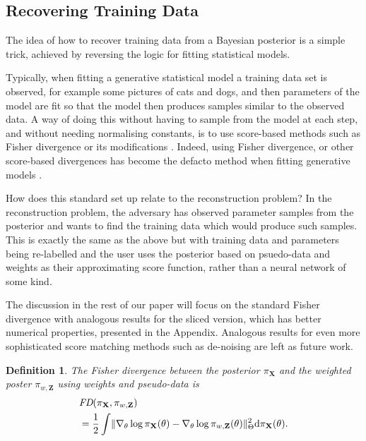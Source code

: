 \documentclass[hyperref]{article}
\theoremstyle{plain}
\newtheorem{definition}[theorem]{Definition}
\theoremstyle{remark}
\newcommand{\bX}{\mathbf{X}}
\newcommand{\bZ}{\mathbf{Z}}
\begin{document}
\subsection{Recovering Training Data}\label{subsec:bayesian_recovery}
The idea of how to recover training data from a Bayesian posterior is a simple trick, achieved by reversing the logic for fitting statistical models. 

Typically, when fitting a generative statistical model a training data set is observed, for example some pictures of cats and dogs, and then parameters of the model are fit so that the model then produces samples similar to the observed data. A way of doing this without having to sample from the model at each step, and without needing normalising constants, is to use score-based methods such as Fisher divergence or its modifications \citep{hyvarinen2005,song2019sliced}. Indeed, using Fisher divergence, or other score-based divergences has become the defacto method when fitting generative models \citep{Song2020_how_to_train}. 

How does this standard set up relate to the reconstruction problem? In the reconstruction problem, the adversary has observed parameter samples from the posterior and wants to find the training data which would produce such samples. This is exactly the same as the above but with training data and parameters being re-labelled and the user uses the posterior based on psuedo-data and weights as their approximating score function, rather than a neural network of some kind. 

The discussion in the rest of our paper will focus on the standard Fisher divergence with analogous results for the sliced version, which has better numerical properties, presented in the Appendix. Analogous results for even more sophisticated score matching methods such as de-noising are left as future work. 

\begin{definition}
	The Fisher divergence between the posterior $\pi_{\bX}$ and the weighted poster $\pi_{w,\bZ}$ using weights and pseudo-data is 
	\begin{align}
		&\emph{FD}(\pi_{\bX},\pi_{w,\bZ}) \nonumber\\
		& = \frac{1}{2}\int \lVert \nabla_{\theta}\log\pi_{\bX}(\theta) - \nabla_{\theta}\log\pi_{w,\bZ}(\theta)\rVert_{\Theta}^{2}\mathrm{d}\pi_{\bX}(\theta).\label{eq:FD}
	\end{align}
\end{definition}
\end{document}
